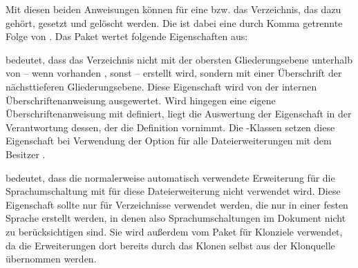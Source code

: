 \begin{Declaration}
\end{Declaration}
Mit diesen beiden Anweisungen können  für eine
 bzw. das Verzeichnis, das dazu gehört, gesetzt und
gelöscht werden. Die  ist dabei eine durch
Komma getrennte Folge von . Das Paket
 wertet folgende Eigenschaften aus:
\begin{description}%
\item[\PValue{leveldown}] bedeutet, dass das Verzeichnis nicht mit der
  obersten Gliederungsebene unterhalb von  -- wenn
  vorhanden , sonst 
  -- erstellt wird, sondern mit einer Überschrift der nächsttieferen
  Gliederungsebene. Diese Eigenschaft wird von der internen
  Überschriftenanweisung ausgewertet. Wird  hingegen eine
  eigene Überschriftenanweisung mit 
  definiert, liegt die Auswertung der Eigenschaft in der Verantwortung dessen,
  der die Definition vornimmt. Die \KOMAScript-Klassen setzen diese
  Eigenschaft bei Verwendung der Option
   für alle Dateierweiterungen mit
  dem Besitzer .
\item[\PValue{nobabel}] bedeutet, dass die normalerweise automatisch
  verwendete Erweiterung für die Sprachumschaltung mit
   für diese Dateierweiterung nicht
  verwendet wird. Diese Eigenschaft sollte nur für Verzeichnisse verwendet
  werden, die nur in einer festen Sprache erstellt werden, in denen also
  Sprachumschaltungen im Dokument nicht zu berücksichtigen sind. Sie wird
  außerdem vom Paket
  \cite{package:scrwfile} für Klonziele verwendet, da die Erweiterungen dort
  bereits durch das Klonen selbst aus der Klonquelle übernommen werden.


\end{description}
